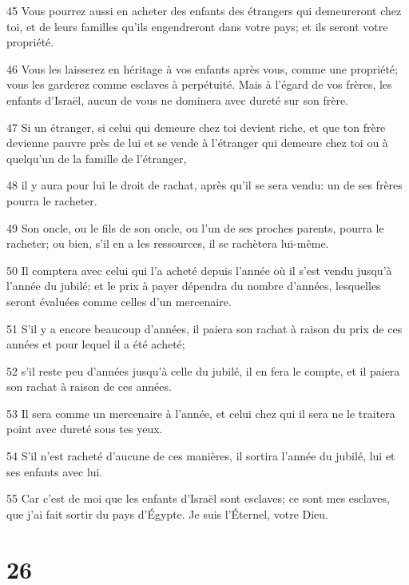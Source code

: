 \par 45 Vous pourrez aussi en acheter des enfants des étrangers qui demeureront chez toi, et de leurs familles qu'ils engendreront dans votre pays; et ils seront votre propriété.
\par 46 Vous les laisserez en héritage à vos enfants après vous, comme une propriété; vous les garderez comme esclaves à perpétuité. Mais à l'égard de vos frères, les enfants d'Israël, aucun de vous ne dominera avec dureté sur son frère.
\par 47 Si un étranger, si celui qui demeure chez toi devient riche, et que ton frère devienne pauvre près de lui et se vende à l'étranger qui demeure chez toi ou à quelqu'un de la famille de l'étranger,
\par 48 il y aura pour lui le droit de rachat, après qu'il se sera vendu: un de ses frères pourra le racheter.
\par 49 Son oncle, ou le fils de son oncle, ou l'un de ses proches parents, pourra le racheter; ou bien, s'il en a les ressources, il se rachètera lui-même.
\par 50 Il comptera avec celui qui l'a acheté depuis l'année où il s'est vendu jusqu'à l'année du jubilé; et le prix à payer dépendra du nombre d'années, lesquelles seront évaluées comme celles d'un mercenaire.
\par 51 S'il y a encore beaucoup d'années, il paiera son rachat à raison du prix de ces années et pour lequel il a été acheté;
\par 52 s'il reste peu d'années jusqu'à celle du jubilé, il en fera le compte, et il paiera son rachat à raison de ces années.
\par 53 Il sera comme un mercenaire à l'année, et celui chez qui il sera ne le traitera point avec dureté sous tes yeux.
\par 54 S'il n'est racheté d'aucune de ces manières, il sortira l'année du jubilé, lui et ses enfants avec lui.
\par 55 Car c'est de moi que les enfants d'Israël sont esclaves; ce sont mes esclaves, que j'ai fait sortir du pays d'Égypte. Je suis l'Éternel, votre Dieu.

\chapter{26}

